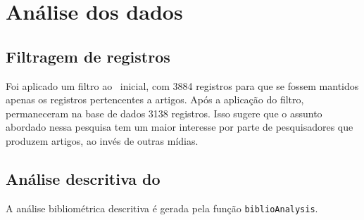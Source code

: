 \section{Análise dos dados}

\subsection{Filtragem de registros}
Foi aplicado um filtro ao \dataset\ inicial, com 3884 registros para que se fossem mantidos apenas os registros pertencentes a artigos. Após a aplicação do filtro,
permaneceram na base de dados 3138 registros. Isso sugere que o assunto abordado nessa pesquisa tem um maior interesse por parte de pesquisadores que produzem artigos, ao invés de outras mídias.
\subsection{Análise descritiva do \dataset\ }

A análise bibliométrica descritiva é gerada pela função \texttt{biblioAnalysis}.

